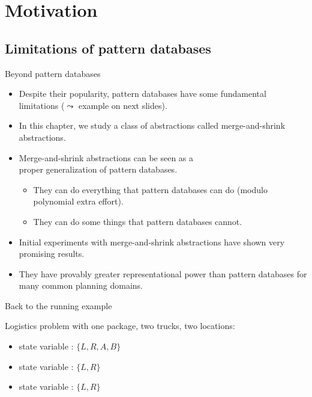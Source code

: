 \documentclass{gkibeamer}
\begin{document}
\subtitle{12.~Planning as search: merge-and-shrink abstractions}
\date{January 13th, 2012}
\maketitles

\section{Motivation}
\subsection[PDB limitations]{Limitations of pattern databases}

\begin{frame}{Beyond pattern databases}
  \begin{itemize}
  \item Despite their popularity, pattern databases have some
    \alert{fundamental limitations} ($\leadsto$ example on next
    slides).
  \item In this chapter, we study a class of
    abstractions called \alert{merge-and-shrink abstractions}.
  \item Merge-and-shrink abstractions can be seen as a \\
    \alert{proper generalization} of pattern databases.
    \begin{itemize}
    \item They can do everything that pattern databases can do
      (modulo polynomial extra effort).
    \item They can do some things that pattern databases cannot.
    \end{itemize}
  \item Initial experiments with merge-and-shrink abstractions have
    shown very promising results.
  \item They have provably greater \alert{representational power} than
    pattern databases for many common planning domains.
  \end{itemize}
\end{frame}

\begin{frame}{Back to the running example}
  \begin{center}
    \picfulltransitiongraph
  \end{center}
  Logistics problem with one package, two trucks, two locations:
  \begin{itemize}
  \item state variable : $\{L,R,A,B\}$
  \item state variable : $\{L,R\}$
  \item state variable : $\{L,R\}$
  \end{itemize}
\end{frame}
\end{document}
